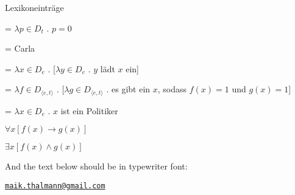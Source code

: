 \begin{exe}
    \ex Lexikoneinträge

     = $\lambda p \in D_t$ . $p=0$

     = Carla

     = $\lambda x \in D_e$ . [$\lambda y \in D_e$ . $y$ lädt $x$ ein]

     = $\lambda f \in D_{\langle e, t\rangle}$ . $[\lambda g \in D_{\langle e, t\rangle}$ . es gibt ein $x$, sodass $f(x)=1$ und $g(x)=1]$

     = $\lambda x \in D_e$ . $x$ ist ein Politiker

    $\forall\! x [f(x) \rightarrow g(x)]$

    $\exists x [f(x) \land g(x)]$
\end{exe}

And the text below should be in typewriter font:

\begin{exe}
    \ex \texttt{\url{maik.thalmann@gmail.com}}
\end{exe}
